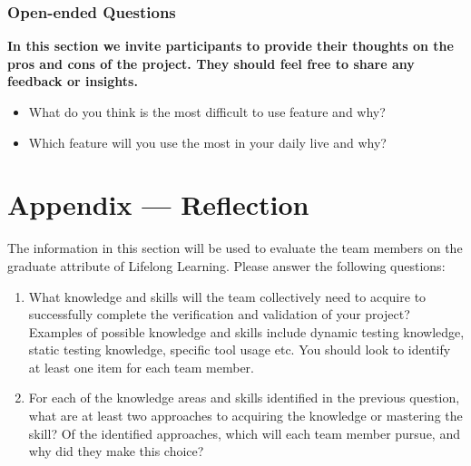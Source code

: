 \documentclass[12pt, titlepage]{article}
\begin{document}
\subsubsection{Open-ended Questions}
\textbf{In this section we invite participants to provide their thoughts on the pros and cons of the project. They should feel free to share any feedback or insights.}
\begin{itemize}
\item What do you think is the most difficult to use feature and why?
\item Which feature will you use the most in your daily live and why?
\end{itemize}
\newpage{}
\section*{Appendix --- Reflection}

The information in this section will be used to evaluate the team members on the
graduate attribute of Lifelong Learning.  Please answer the following questions:

\begin{enumerate}
  \item What knowledge and skills will the team collectively need to acquire to
  successfully complete the verification and validation of your project?
  Examples of possible knowledge and skills include dynamic testing knowledge,
  static testing knowledge, specific tool usage etc.  You should look to
  identify at least one item for each team member.
  \item For each of the knowledge areas and skills identified in the previous
  question, what are at least two approaches to acquiring the knowledge or
  mastering the skill?  Of the identified approaches, which will each team
  member pursue, and why did they make this choice?
\end{enumerate}
\end{document}
